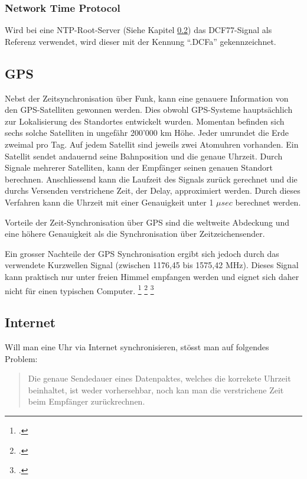 \subsubsection{Network Time Protocol}
Wird bei eine NTP-Root-Server (Siehe Kapitel \ref{Anaylse:Internet}) das DCF77-Signal als Referenz verwendet, wird dieser mit der Kennung "`.DCFa"' gekennzeichnet.

\subsection{GPS}
Nebst der Zeitsynchronisation über Funk, kann eine genauere Information von den GPS-Satelliten gewonnen werden. Dies obwohl GPS-Systeme hauptsächlich zur Lokalisierung des Standortes entwickelt wurden.
Momentan befinden sich sechs solche Satelliten in ungefähr 200'000 km Höhe. Jeder umrundet die Erde zweimal pro Tag. Auf jedem Satellit sind jeweils zwei Atomuhren vorhanden.
Ein Satellit sendet andauernd seine Bahnposition und die genaue Uhrzeit. Durch Signale mehrerer Satelliten, kann der Empfänger seinen genauen Standort berechnen.
Anschliessend kann die Laufzeit des Signals zurück gerechnet und die durchs Versenden verstrichene Zeit, der Delay, approximiert werden.
Durch dieses Verfahren kann die Uhrzeit mit einer Genauigkeit unter 1 ${\mu}sec$ berechnet werden.

Vorteile der Zeit-Synchronisation über GPS sind die weltweite Abdeckung und eine höhere Genauigkeit als die Synchronisation über Zeitzeichensender.

Ein grosser Nachteile der GPS Synchronisation ergibt sich jedoch durch das verwendete Kurzwellen Signal (zwischen 1176,45 bis 1575,42 MHz). Dieses Signal kann praktisch nur unter freien Himmel empfangen werden und eignet sich daher nicht für einen typischen Computer.
\footcite{hopfDCF_GPS}
\footcite{rgbtechnologyGpsTime}
\footcite{rubTimesync}


\subsection{Internet} \label{Anaylse:Internet}

Will man eine Uhr via Internet synchronisieren, stösst man auf folgendes Problem:

\begin{verse}
Die genaue Sendedauer eines  Datenpaktes, welches die korrekete Uhrzeit beinhaltet, ist weder vorhersehbar, noch kan man die verstrichene Zeit beim Empfänger zurückrechnen.
\end{verse}

